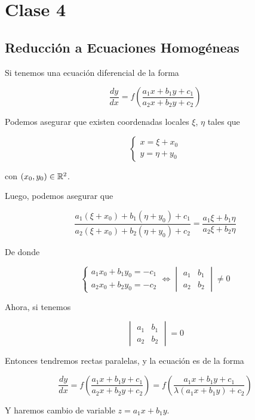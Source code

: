 \section{Clase 4}
\subsection{Reducción a Ecuaciones Homogéneas}

Si tenemos una ecuación diferencial de la forma

\[
    \frac{dy}{dx} = f\left( \frac{a_1x + b_1y +c_1}{a_2x + b_2y + c_2} \right)
\]

Podemos asegurar que existen coordenadas locales $\xi$, $\eta$ tales que

\[
    \begin{cases*}
        x = \xi  + x_0 \\
        y = \eta + y_0
    \end{cases*}
\]

\noindent
con $(x_0, y_0) \in \mathbb{R}^2$.

Luego, podemos asegurar que

\[
    \frac{a_1(\xi + x_0) + b_1(\eta + y_0) + c_1}{a_2(\xi + x_0) + b_2(\eta + y_0) + c_2} = \frac{a_1 \xi + b_1 \eta}{a_2 \xi + b_2 \eta}
\]

De donde

\[
    \begin{cases*}
        a_1x_0 + b_1y_0 = -c_1 \\
        a_2x_0 + b_2y_0 = -c_2
    \end{cases*}\iff
    \begin{vmatrix}
        a_1 & b_1 \\
        a_2 & b_2
    \end{vmatrix} \neq 0
\]


Ahora, si tenemos 

\[
    \begin{vmatrix}
        a_1 & b_1 \\
        a_2 & b_2
    \end{vmatrix} = 0
\]

Entonces tendremos rectas paralelas, y la ecuación es de la forma

\[
    \frac{dy}{dx} = f\left( \frac{a_1x + b_1y + c_1}{a_2x + b_2y + c_2} \right) = f\left( \frac{a_1x + b_1y + c_1}{\lambda(a_1x + b_1y) + c_2} \right)
\]

Y haremos cambio de variable $z = a_1x + b_1y$.

